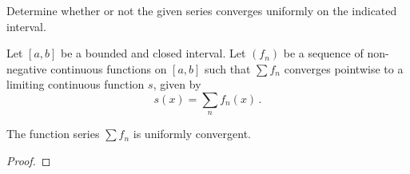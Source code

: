\documentclass[week=6]{homework}
\date{\today}
\begin{document}
    \maketitle
    \thispagestyle{empty}
    \newpage
    \begin{questions}
		\let\firstquestion\question
		\renewcommand*{\question}{\vspace{7mm}\firstquestion}
        \firstquestion
        
        \question
        
        \question
        
        \question
        Determine whether or not the given series converges uniformly on the indicated interval.
        \begin{parts}
        	\part $\displaystyle \sum \frac{x^k}{k^2}$ with $x \in [0,1]$.
        	
        	\part $\displaystyle \sum x^ke^{-kx}$ with $x \in [0,\infty)$.
        	
        	\part $\displaystyle \sum k^re^{-kx}$ with $x \in [a,\infty)$, where $a > 0$ and $r \in \reals$ a constant.
        	
        	\part $\displaystyle \sum \frac{1}{x^k + 1}$ with $x \in (0,1]$.
        	
        	\part $\displaystyle \sum \frac{1}{x^k + 1}$ with $x \in (1,\infty)$.
        \end{parts}
	    
	    \question
	    
	    \question
	    Let $[a,b]$ be a bounded and closed interval. Let $(f_n)$ be a sequence of non-negative continuous functions on $[a,b]$ such that $\sum f_n$ converges pointwise to a limiting continuous function $s$, given by
	    \[
		    s(x) = \sum_n f_n(x)\,.
	    \]
	    \begin{toprove}
	    	The function series $\sum f_n$ is uniformly convergent.
	    \end{toprove}
	    \begin{proof}
	    \end{proof}
     \end{questions}
\end{document}
